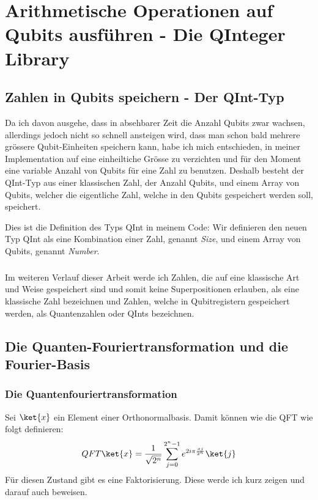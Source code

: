 \chapter{Arithmetische Operationen auf Qubits ausführen - Die QInteger Library}
\section{Zahlen in Qubits speichern - Der QInt-Typ}
Da ich davon ausgehe, dass in absehbarer Zeit die Anzahl Qubits zwar wachsen, allerdings jedoch nicht so schnell ansteigen wird, dass man schon bald mehrere grössere Qubit-Einheiten speichern kann, habe ich mich entschieden, in meiner Implementation auf eine einheiltiche Grösse zu verzichten und für den Moment eine variable Anzahl von Qubits für eine Zahl zu benutzen. Deshalb besteht der QInt-Typ aus einer klassischen Zahl, der Anzahl Qubits, und einem Array von Qubits, welcher die eigentliche Zahl, welche in den Qubits gespeichert werden soll, speichert.



Dies ist die Definition des Typs QInt in meinem Code: Wir definieren den neuen Typ \grqq QInt\grqq{} als eine Kombination einer Zahl, genannt \textit{Size}, und einem Array von Qubits, genannt \textit{Number}.

\paragraph{}

Im weiteren Verlauf dieser Arbeit werde ich Zahlen, die auf eine klassische Art und Weise gespeichert sind und somit keine Superpositionen erlauben, als eine \grqq klassische Zahl\grqq{} bezeichnen und Zahlen, welche in Qubitregistern gespeichert werden, als \grqq Quantenzahlen\grqq{} oder \grqq QInts\grqq{} bezeichnen.

\section{Die Quanten-Fouriertransformation und die Fourier-Basis}
\subsection{Die Quantenfouriertransformation}
Sei $\ket{x}$ ein Element einer Orthonormalbasis. Damit können wie die QFT wie folgt definieren:
$$QFT\ket{x} = \frac{1}{\sqrt{2^n}}\sum^{2^n - 1}_{j = 0}e^{2i\pi\frac{xj}{2^n}}\ket{j}$$
Für diesen Zustand gibt es eine Faktorisierung. Diese werde ich kurz zeigen und darauf auch beweisen.

